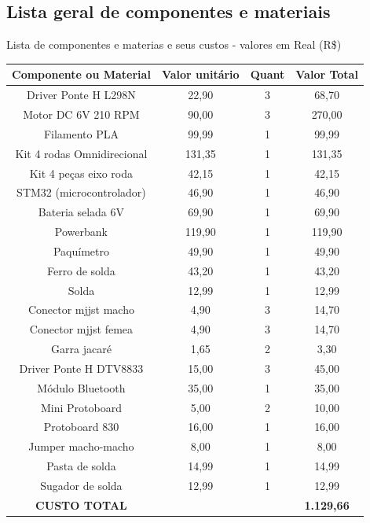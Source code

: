 \subsection{Lista geral de componentes e materiais}

\begin{quadro}[htb]
	\caption{Lista de componentes e materias e seus custos - valores em Real (R\$)}
	 \begin{tabular}{|c|c|c|c|}
		\hline
		\textbf{Componente ou Material} & \textbf{Valor unitário} & \textbf{Quant} & \textbf{Valor Total} \\ \hline
		Driver Ponte H L298N \cite{l298n_produto} &  22,90 & 3 &  68,70   \\ \hline
		Motor DC 6V 210 RPM \cite{motor_dc_6v_produto} &  90,00 & 3 &  270,00   \\ \hline
		Filamento PLA \cite{filamento_pla_produto} &  99,99 & 1 &  99,99   \\ \hline
		Kit 4 rodas Omnidirecional \cite{omin_wheel_produto} &  131,35 & 1 &  131,35   \\ \hline
		Kit 4 peças eixo roda \cite{omin_wheel_produto} &  42,15 & 1 &  42,15   \\ \hline
		STM32 (microcontrolador) \cite{stm32_produto} &  46,90 & 1 &  46,90   \\ \hline
		Bateria selada 6V \cite{bateria_6v_produto} &  69,90 & 1 &  69,90  \\ \hline
		Powerbank &  119,90 & 1 &  119,90   \\ \hline
		Paquímetro  &  49,90 & 1 &  49,90   \\ \hline
		Ferro de solda &  43,20 & 1 &  43,20   \\ \hline
		Solda &  12,99 & 1 &  12,99   \\ \hline
		Conector mjjst macho &  4,90 & 3 &  14,70   \\ \hline
		Conector mjjst femea &  4,90 & 3 &  14,70   \\ \hline
		Garra jacaré &  1,65 & 2 &  3,30   \\ \hline
		Driver Ponte H DTV8833 \cite{drv8833_produto} &  15,00 & 3 &  45,00   \\ \hline
		Módulo Bluetooth \cite{hc05_produto} &  35,00 & 1 &  35,00   \\ \hline
		Mini Protoboard &  5,00 & 2 &  10,00   \\ \hline
		Protoboard 830 &  16,00 & 1 &  16,00   \\ \hline
		Jumper macho-macho &  8,00 & 1 &  8,00   \\ \hline
		Pasta de solda &  14,99 & 1 &  14,99   \\ \hline
		Sugador de solda &  12,99 & 1 &  12,99   \\ \hline	
		\textbf{CUSTO TOTAL} & & & \textbf{ 1.129,66}   \\ \hline
	\end{tabular}
\end{quadro}


